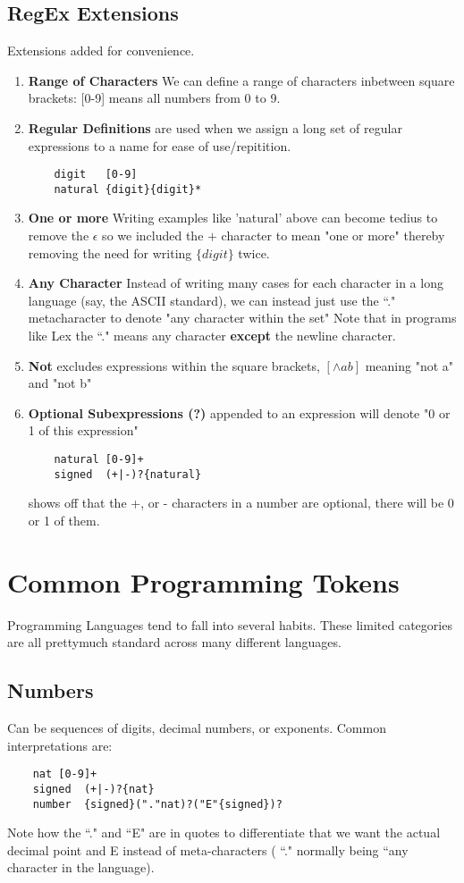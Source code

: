 \documentclass{report}
\theoremstyle{definition}
\begin{document}
		\subsection{RegEx Extensions}
			Extensions added for convenience.
			\begin{enumerate}
				\item \textbf{Range of Characters} We can define a range of characters inbetween square brackets:
					[0-9] means all numbers from 0 to 9.
				\item \textbf{Regular Definitions} are used when we assign a long set of regular expressions to a name 
					for ease of use/repitition.
					\begin{lstlisting}
	digit	[0-9]
	natural	{digit}{digit}*
					\end{lstlisting}
				\item \textbf{One or more} Writing examples like 'natural' above can become tedius to remove the $\epsilon$
					so we included the $+$ character to mean "one or more" thereby removing the need for writing $\{digit\}$
					twice.
				\item \textbf{Any Character} Instead of writing many cases for each character in a long language (say, the 
					ASCII standard), we can instead just use the ``." metacharacter to denote "any character within the set"
					Note that in programs like Lex the ``." means any character \textbf{except} the newline character.
				\item \textbf{Not} excludes expressions within the square brackets, $[\wedge ab]$ meaning "not a" and "not b"
				\item \textbf{Optional Subexpressions (?)} appended to an expression will denote "0 or 1 of this expression"
\begin{lstlisting}
	natural	[0-9]+
	signed	(+|-)?{natural}
\end{lstlisting} 
				shows off that the +, or - characters in a number are optional, there will be 0 or 1 of them.
			\end{enumerate}
	\section{Common Programming Tokens}
		Programming Languages tend to fall into several habits. These limited categories are all prettymuch standard
		across many different languages.
		\subsection{Numbers}
			Can be sequences of digits, decimal numbers, or exponents. Common interpretations are:
\begin{lstlisting}
	nat	[0-9]+
	signed	(+|-)?{nat}
	number	{signed}("."nat)?("E"{signed})?
\end{lstlisting}
			Note how the ``." and ``E" are in quotes to differentiate that we want the actual decimal point and E instead
			of meta-characters ( ``." normally being ``any character in the language).
\end{document}
